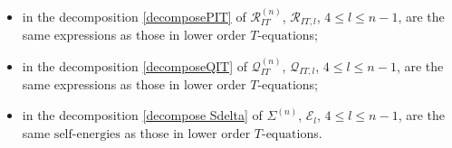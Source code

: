 \documentclass{article}
\newcommand{\1}{\mathds{1}}
\numberwithin{equation}{section}
\newcommand{\fb}{{\mathfrak b}}
\renewcommand{\cal}{\mathcal}
\renewcommand{\leq}{\leqslant}
\renewcommand{\le}{\leq}
\newcommand{\selfs}{\text{self-energies}}
\theoremstyle{plain} %
\theoremstyle{remark}
\newcommand{\Sdelta}{{\Sigma}_T}
\newcommand{\wtSdelta}{\Sigma}
\newcommand{\wtSdeltan}{\Sigma^{(n)}}
\newcommand{\Sele}{{\mathcal E}}
\newcommand{\incomp}{{\text{$T$-equation}}}
\newcommand{\PIT}{\mathcal R_{IT}}
\newcommand{\QIT}{\mathcal Q_{IT}}
\begin{document}
\begin{itemize}


\item in the decomposition \eqref{decomposePIT} of $\PIT^{(n)}$, $\cal R_{IT,l}$, $4\le l\le n-1$, are the same expressions as those in lower order $\incomp$s; 

\item in the decomposition \eqref{decomposeQIT} of $\QIT^{(n)}$, $\cal Q_{IT,l}$, $4\le l\le n-1$, are the same expressions as those in lower order $\incomp$s; 

\item in the decomposition \eqref{decompose Sdelta} of $\wtSdeltan$, $\Sele_{l}$, $4\le l\le n-1$, are the same $\selfs$ as those in lower order $\incomp$s.




\end{itemize}
\end{document}
